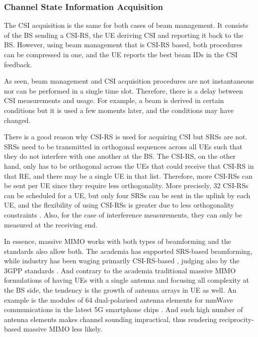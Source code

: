 \subsubsection*{Channel State Information Acquisition}

The CSI acquisition is the same for both cases of beam management. It consists of the BS sending a CSI-RS, the UE deriving CSI and reporting it back to the BS. However, using beam management that is CSI-RS based, both procedures can be compressed in one, and the UE reports the best beam IDs in the CSI feedback.

As seen, beam management and CSI acquisition procedures are not instantaneous nor can be performed in a single time slot. Therefore, there is a delay between CSI measurements and usage. For example, a beam is derived in certain conditions but it is used a few moments later, and the conditions may have changed. 

There is a good reason why CSI-RS is used for acquiring CSI but SRSs are not. SRSs need to be transmitted in orthogonal sequences across all UEs such that they do not interfere with one another at the BS. The CSI-RS, on the other hand, only has to be orthogonal across the UEs that could receive that CSI-RS in that RE, and there may be a single UE in that list. Therefore, more CSI-RSs can be sent per UE since they require less orthogonality. More precisely, 32 CSI-RSs can be scheduled for a UE, but only four SRSs can be sent in the uplink by each UE, and the flexibility of using CSI-RSs is greater due to less orthogonality constraints \cite{DAHLMAN2018}. Also, for the case of interference measurements, they can only be measured at the receiving end.

In essence, massive MIMO works with both types of beamforming and the standards also allow both. The academia has supported SRS-based beamforming, while industry has been waging primarily CSI-RS-based \cite{tddVSfdd_massiveMIMO}, judging also by the 3GPP standards \cite{3gpp-codebooks}. And contrary to the academia traditional massive MIMO formulations of having UEs with a single antenna and focusing all complexity at the BS side, the tendency is the growth of antenna arrays in \acs{UE} as well. An example is the modules of 64 dual-polarised antenna elements for mmWave communications in the latest 5G smartphone chips \cite{qualcomm_64_antenna}. And such high number of antenna elements makes channel sounding impractical, thus rendering reciprocity-based massive MIMO less likely.


